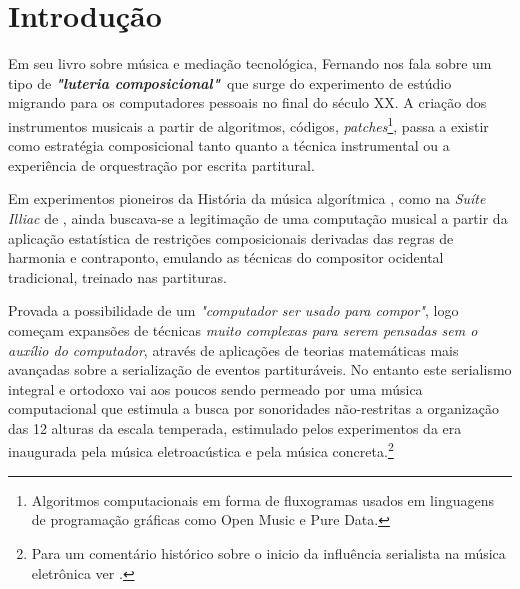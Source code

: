 \documentclass[
	12pt,				%
	openright,			%
	twoside,			%
	a4paper,			%
	english,			%
	french,				%
	spanish,			%
	brazil				%
	]{abntex2}
\begin{document}
\tableofcontents*
\cleardoublepage

%
%
%
%
%
%
%
\textual




\chapter*[Introdução]{Introdução}

Em seu livro sobre música e mediação tecnológica, Fernando  nos fala sobre um tipo de \textit{\textbf{"luteria composicional"}}\ que surge do experimento de estúdio migrando para os computadores pessoais no final do século XX. A criação dos instrumentos musicais a partir de algoritmos, códigos, \textit{patches}\footnote{Algoritmos computacionais em forma de fluxogramas usados em linguagens de programação gráficas como Open Music e Pure Data.}, passa a existir como estratégia composicional tanto quanto a técnica instrumental ou a experiência de orquestração por escrita partitural. 

Em experimentos pioneiros da História da música algorítmica , como na \textit{Suíte Illiac} de , ainda buscava-se a legitimação de uma computação musical a partir da aplicação estatística de restrições composicionais derivadas das regras de harmonia e contraponto, emulando as técnicas do compositor ocidental tradicional, treinado nas partituras. 

Provada a possibilidade de um \textit{"computador ser usado para compor"}, logo começam expansões de técnicas \textit{muito complexas para serem pensadas sem o auxílio do computador}, através de aplicações de teorias matemáticas mais avançadas sobre a serialização de eventos partituráveis. No entanto este serialismo integral e ortodoxo vai aos poucos sendo permeado por uma música computacional que estimula a busca por sonoridades não-restritas a organização das 12 alturas da escala temperada, estimulado pelos experimentos da era inaugurada pela música eletroacústica e pela música concreta.\footnote{Para um comentário histórico sobre o inicio da influência serialista na música eletrônica ver . } 
\end{document}
